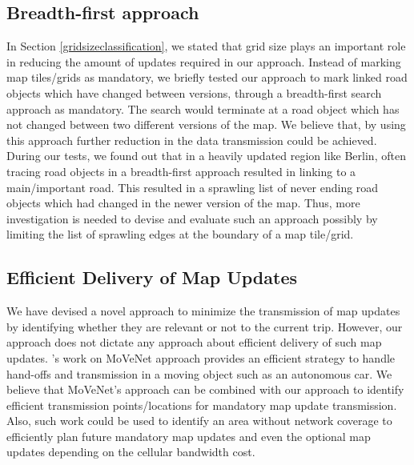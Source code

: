 \subsection{Breadth-first approach} \label{futurebfs}
In Section \ref{gridsizeclassification}, we stated that grid size plays an important role in reducing the amount of updates required in our approach. Instead of marking map tiles/grids as mandatory, we briefly tested our approach to mark linked road objects which have changed between versions, through a breadth-first search approach as mandatory. The search would terminate at a road object which has not changed between two different versions of the map. We believe that, by using this approach further reduction in the data transmission could be achieved. During our tests, we found out that in a heavily updated region like Berlin, often tracing road objects in a breadth-first approach resulted in linking to a main/important road. This resulted in a sprawling list of never ending road objects which had changed in the newer version of the map. Thus, more investigation is needed to devise and evaluate such an approach possibly by limiting the list of sprawling edges at the boundary of a map tile/grid.
\subsection{Efficient Delivery of Map Updates}
We have devised a novel approach to minimize the transmission of map updates by identifying whether they are relevant or not to the current trip. However, our approach does not dictate any approach about efficient delivery of such map updates. \citet{movenet}'s work on MoVeNet approach provides an efficient strategy to handle hand-offs and transmission in a moving object such as an autonomous car. We believe that MoVeNet's approach can be combined with our approach to identify efficient transmission points/locations for mandatory map update transmission. Also, such work could be used to identify an area without network coverage to efficiently plan future mandatory map updates and even the optional map updates depending on the cellular bandwidth cost.




